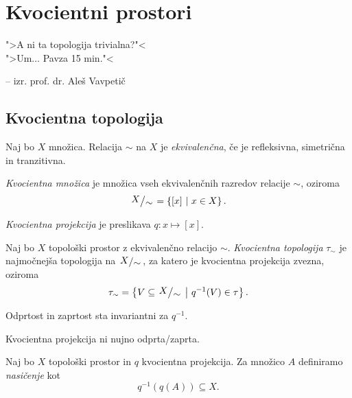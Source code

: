\section{Kvocientni prostori}

\epigraph{">A ni ta topologija trivialna?"<\\
">Um... Pavza 15 min."<}
{-- izr. prof. dr. Aleš Vavpetič}

\subsection{Kvocientna topologija}


\begin{definicija}
Naj bo $X$ množica. Relacija $\sim$ na $X$ je
\emph{ekvivalenčna}, če je refleksivna,
simetrična in tranzitivna.
\end{definicija}

\begin{definicija}
\emph{Kvocientna množica} je množica vseh
ekvivalenčnih razredov relacije $\sim$, oziroma
\[
\kvoc{X}{\sim} = \setb{[x]}{x \in X}.
\]
\end{definicija}

\begin{definicija}
\emph{Kvocientna projekcija} je
preslikava $q \colon x \mapsto [x]$.
\end{definicija}

\begin{definicija}
Naj bo $X$ topološki prostor z ekvivalenčno relacijo $\sim$.
\emph{Kvocientna topologija}
$\tau_\sim$ je najmočnejša topologija na $\kvoc{X}{\sim}$, za
katero je kvocientna projekcija zvezna, oziroma
\[
\tau_\sim = \setb{V \subseteq \kvoc{X}{\sim}}{q^{-1}(V) \in \tau}.
\]
\end{definicija}

\begin{opomba}
Odprtost in zaprtost sta invariantni za $q^{-1}$.
\end{opomba}

\begin{opomba}
Kvocientna projekcija ni nujno odprta/zaprta.
\end{opomba}

\begin{definicija}
Naj bo $X$ topološki prostor in $q$ kvocientna projekcija. Za
množico $A$ definiramo \emph{nasičenje} kot
\[
q^{-1}(q(A)) \subseteq X.
\]
\end{definicija}

